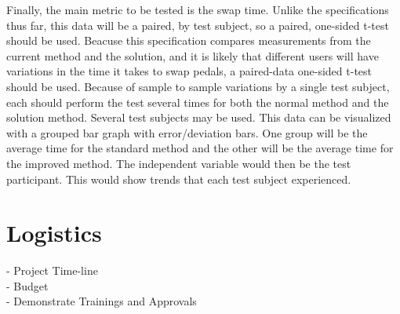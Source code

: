 \documentclass{article}
\begin{document}
	Finally, the main metric to be tested is the swap time.  Unlike the specifications thus far, this data will be a paired, by test subject, so a paired, one-sided t-test should be used.  Beacuse this specification compares measurements from the current method and the solution, and it is likely that different users will have variations in the time it takes to swap pedals, a paired-data one-sided t-test should be used.  Because of sample to sample variations by a single test subject, each should perform the test several times for both the normal method and the solution method.  Several test subjects may be used.  This data can be visualized with a grouped bar graph with error/deviation bars.  One group will be the average time for the standard method and the other will be the average time for the improved method.  The independent variable would then be the test participant.  This would show trends that each test subject experienced.


\section{Logistics}
	- Project Time-line \\
	- Budget \\
	- Demonstrate Trainings and Approvals

\newpage
% 
% 
\end{document}
